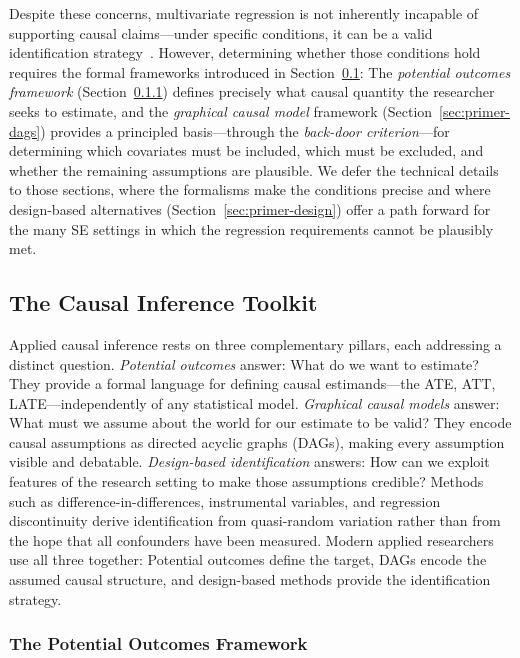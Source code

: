 Despite these concerns, multivariate regression is not inherently incapable of supporting causal claims---under specific conditions, it can be a valid identification strategy~\cite{angrist2009mostly, cunningham2021causal}.
However, determining whether those conditions hold requires the formal frameworks introduced in Section~\ref{sec:primer-toolkit}: The \emph{potential outcomes framework} (Section~\ref{sec:primer-po}) defines precisely what causal quantity the researcher seeks to estimate, and the \emph{graphical causal model} framework (Section~\ref{sec:primer-dags}) provides a principled basis---through the \emph{back-door criterion}---for determining which covariates must be included, which must be excluded, and whether the remaining assumptions are plausible.
We defer the technical details to those sections, where the formalisms make the conditions precise and where design-based alternatives (Section~\ref{sec:primer-design}) offer a path forward for the many SE settings in which the regression requirements cannot be plausibly met.

\subsection{The Causal Inference Toolkit}
\label{sec:primer-toolkit}

Applied causal inference rests on three complementary pillars, each addressing a distinct question.
\emph{Potential outcomes} answer: What do we want to estimate?
They provide a formal language for defining causal estimands---the ATE, ATT, LATE---independently of any statistical model.
\emph{Graphical causal models} answer: What must we assume about the world for our estimate to be valid?
They encode causal assumptions as directed acyclic graphs (DAGs), making every assumption visible and debatable.
\emph{Design-based identification} answers: How can we exploit features of the research setting to make those assumptions credible?
Methods such as difference-in-differences, instrumental variables, and regression discontinuity derive identification from quasi-random variation rather than from the hope that all confounders have been measured.
Modern applied researchers use all three together: Potential outcomes define the target, DAGs encode the assumed causal structure, and design-based methods provide the identification strategy.

\subsubsection{The Potential Outcomes Framework}
\label{sec:primer-po}


